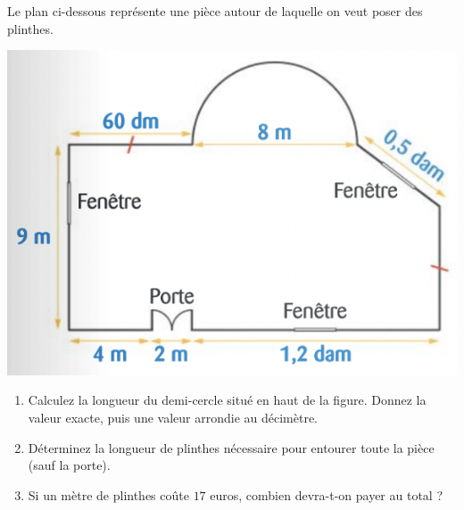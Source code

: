\documentclass[14pt]{extreport}
\theoremstyle{plain}
\begin{document}
 Le plan ci-dessous représente une pièce autour de laquelle on veut poser des plinthes. 
\begin{center} 
\includegraphics[scale=1.15]{Exo3}
\end{center}
\begin{enumerate}
\item Calculez la longueur du demi-cercle situé en haut de la figure. Donnez la valeur exacte, puis une valeur arrondie au décimètre. 
\item Déterminez la longueur de plinthes nécessaire pour entourer toute la pièce (sauf la porte).
\item Si un mètre de plinthes coûte $17$ euros, combien devra-t-on payer au total ? 
\end{enumerate}
\end{document}

